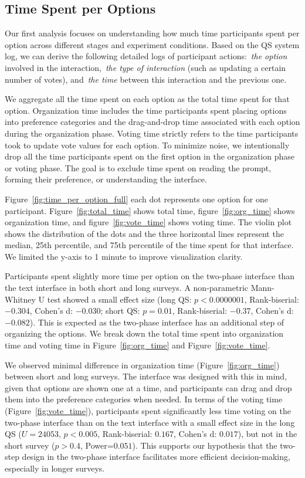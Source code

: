 \subsection{Time Spent per Options}
\label{sec:time_per_option}
Our first analysis focuses on understanding how much time participants spent per option across different stages and experiment conditions. Based on the QS system log, we can derive the following detailed logs of participant actions:~\textit{the option}  involved in the interaction,~\textit{the type of interaction} (such as updating a certain number of votes), and~\textit{the time} between this interaction and the previous one.

We aggregate all the time spent on each option as the total time spent for that option. Organization time includes the time participants spent placing options into preference categories and the drag-and-drop time associated with each option during the organization phase. Voting time strictly refers to the time participants took to update vote values for each option. To minimize noise, we intentionally drop all the time participants spent on the first option in the organization phase or voting phase. The goal is to exclude time spent on reading the prompt, forming their preference, or understanding the interface.

Figure~\ref{fig:time_per_option_full} each dot represents one option for one participant. Figure~\ref{fig:total_time} shows total time, figure~\ref{fig:org_time} shows organization time, and figure~\ref{fig:vote_time} shows voting time. The violin plot shows the distribution of the dots and the three horizontal lines represent the median, 25th percentile, and 75th percentile of the time spent for that interface. We limited the y-axis to 1 minute to improve visualization clarity.

Participants spent slightly more time per option on the two-phase interface than the text interface in both short and long surveys. A non-parametric Mann-Whitney U test showed a small effect size (long QS: $p<0.0000001$, Rank-biserial: $-0.304$, Cohen's d: $-0.030$; short QS: $p=0.01$, Rank-biserial: $-0.37$, Cohen's d: $-0.082$). This is expected as the two-phase interface has an additional step of organizing the options. We break down the total time spent into organization time and voting time in Figure~\ref{fig:org_time} and Figure~\ref{fig:vote_time}.

We observed minimal difference in organization time (Figure~\ref{fig:org_time}) between short and long surveys. The interface was designed with this in mind, given that options are shown one at a time, and participants can drag and drop them into the preference categories when needed. In terms of the voting time (Figure~\ref{fig:vote_time}), participants spent significantly less time voting on the two-phase interface than on the text interface with a small effect size in the long QS ($U=24053$, $p<0.005$, Rank-biserial: $0.167$, Cohen's d: $0.017$), but not in the short survey ($p>0.4$, Power=$0.051$). This supports our hypothesis that the two-step design in the two-phase interface facilitates more efficient decision-making, especially in longer surveys.


